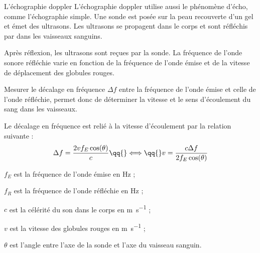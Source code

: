 \begin{doc}{L'échographie doppler}
  L'échographie doppler utilise aussi le phénomène d'écho, comme l'échographie simple.
  Une sonde est posée sur la peau recouverte d'un gel et émet des ultrasons.
  Les ultrasons se propagent dans le corps et sont réfléchis par  dans les vaisseaux sanguins.

  \begin{wrapfigure}[10]{l}{0.5\linewidth}
    \centering
    \vspace*{-10pt}
  \end{wrapfigure}

  Après réflexion, les ultrasons sont reçues par la sonde.
  La fréquence de l'onde sonore réfléchie varie en fonction de la fréquence de l'onde émise et de la vitesse de déplacement des globules rouges.

  Mesurer le décalage en fréquence $\Delta f$ entre la fréquence de l'onde émise et celle de l'onde réfléchie, permet donc de déterminer la vitesse et le sens d'écoulement du sang dans les vaisseaux.
  \vspace*{13pt}

  \begin{importants}
    Le décalage en fréquence est relié à la vitesse d'écoulement par la relation suivante :
    \begin{equation*}
      \Delta f = \dfrac{2vf_E \cos(\theta)}{c}
      \qq{} \Longleftrightarrow \qq{}
      v = \dfrac{c \Delta f}{2 f_E \cos(\theta)}
    \end{equation*}
  \end{importants}
  
  \begin{listePoints}[2]
    \item $f_E$ est la fréquence de l'onde émise en \unit{\hertz} ;
    \item $f_R$ est la fréquence de l'onde réfléchie en \unit{\hertz} ;
    \item $c$ est la célérité du son dans le corps en \unit{\m\per\s} ;
    \item $v$ est la vitesse des globules rouges en \unit{\m\per\s} ;
    \item $\theta$ est l'angle entre l'axe de la sonde et l'axe du vaisseau sanguin.
  \end{listePoints}
\end{doc}


